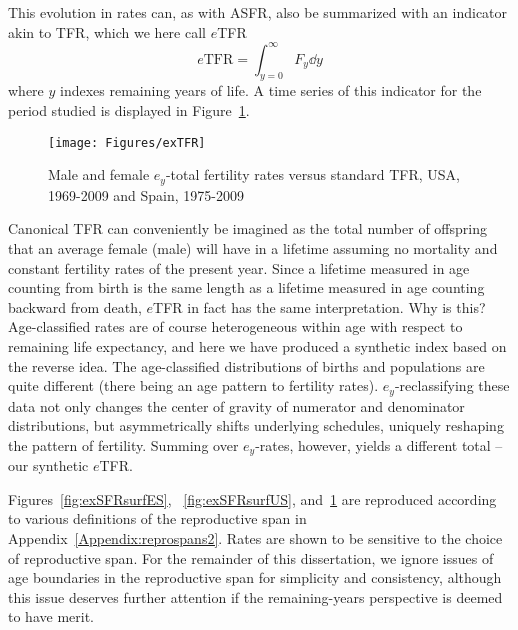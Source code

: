  \FloatBarrier
 \label{sec:etfr}
This evolution in rates can, as with ASFR, also be
summarized with an indicator akin to TFR, which we here call $e$TFR
\begin{equation}
\label{eq:exTFR}
e\mathrm{TFR} = \int _{y=0}^\infty F_y \dd y
\end{equation}
where $y$ indexes remaining years of life. A time series of this indicator
for the period studied is displayed in Figure~\ref{fig:exTFR}.

\begin{figure}[ht!]
        \centering  
          \caption{Male and female $e_y$-total fertility rates versus standard
          TFR, USA, 1969-2009 and Spain, 1975-2009}
           \texttt{[image: Figures/exTFR]}
          \label{fig:exTFR}
\end{figure}

Canonical TFR can conveniently be imagined as the total number of
offspring that an average female (male) will have in a lifetime assuming
no mortality and constant fertility rates of the present year.
Since a lifetime measured in age counting from birth is the same length as a
lifetime measured in age counting backward from death, $e$TFR in fact has the
same interpretation. Why is this? Age-classified rates are of course
heterogeneous within age with respect to remaining life expectancy, and here we
have produced a synthetic index based on the reverse idea. The age-classified
distributions of births and populations are quite different (there being an age
pattern to fertility rates). $e_y$-reclassifying these data not only changes the
center of gravity of numerator and denominator distributions, but asymmetrically
shifts underlying schedules, uniquely reshaping the pattern of
fertility. Summing over $e_y$-rates, however, yields a different total -- our
synthetic $e$TFR. 

Figures~\ref{fig:exSFRsurfES}, ~\ref{fig:exSFRsurfUS}, and~\ref{fig:exTFR} are
reproduced according to various definitions of the reproductive span in
Appendix~\ref{Appendix:reprospans2}. Rates are shown to be sensitive to the
choice of reproductive span. For the remainder of this dissertation, we ignore
issues of age boundaries in the reproductive span for simplicity and
consistency, although this issue deserves further attention if the
remaining-years perspective is deemed to have merit.

\FloatBarrier